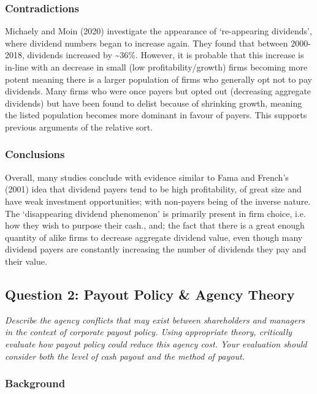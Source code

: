 \documentclass[11pt, english]{article}
\begin{document}
		\subsubsection*{Contradictions}

	Michaely and Moin (2020) investigate the appearance of `re-appearing dividends', where dividend numbers began to increase again. They found that between 2000- 2018, dividends increased by \~{}36\%. However, it is probable that this increase is in-line with an decrease in small (low profitability/growth) firms becoming more potent meaning there is a larger population of firms who generally opt not to pay dividends. Many firms who were once payers but opted out (decreasing aggregate dividends) but have been found to delist because of shrinking growth, meaning the listed population becomes more dominant in favour of payers. This supports previous arguments of the relative sort.

		\subsubsection*{Conclusions}

	Overall, many studies conclude with evidence similar to Fama and French’s (2001) idea that dividend payers tend to be high profitability, of great size and have weak investment opportunities; with non-payers being of the inverse nature. The `disappearing dividend phenomenon' is primarily present in firm choice, i.e. how they wish to purpose their cash., and; the fact that there is a great enough quantity of alike firms to decrease aggregate dividend value, even though many dividend payers are constantly increasing the number of dividends they pay and their value.

	\newpage

	\subsection{Question 2: Payout Policy \& Agency Theory}

	\textit{Describe the agency conflicts that may exist between shareholders and managers in the context of corporate payout policy. Using appropriate theory, critically evaluate how payout policy could reduce this agency cost. Your evaluation should consider both the level of cash payout and the method of payout.}

		\subsubsection*{Background}
\end{document}
